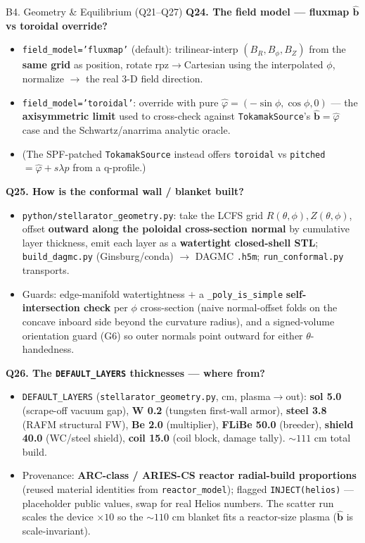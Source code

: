 \documentclass[11pt,aspectratio=169]{beamer}
\newcommand{\bhat}{\hat{\mathbf{b}}}
\newcommand{\qitem}[1]{\medskip\textbf{#1}\par}
\begin{document}
\begin{frame}[allowframebreaks]{B4. Geometry \& Equilibrium (Q21--Q27)}
\qitem{Q24. The field model --- fluxmap $\bhat$ vs toroidal override?}
\begin{itemize}
\item \texttt{field\_model='fluxmap'} (default): trilinear-interp $(B_R, B_\phi, B_Z)$ from
      the \textbf{same grid} as position, rotate rpz$\to$Cartesian using the interpolated
      $\phi$, normalize $\to$ the real 3-D field direction.
\item \texttt{field\_model='toroidal'}: override with pure
      $\hat\varphi = (-\sin\phi, \cos\phi, 0)$ --- the \textbf{axisymmetric limit} used to
      cross-check against \texttt{TokamakSource}'s $\bhat = \hat\varphi$ case and the
      Schwartz/anarrima analytic oracle.
\item (The SPF-patched \texttt{TokamakSource} instead offers \texttt{toroidal} vs
      \texttt{pitched} $= \hat\varphi + s\lambda\hat p$ from a q-profile.)
\end{itemize}

\framebreak
\qitem{Q25. How is the conformal wall / blanket built?}
\begin{itemize}
\item \texttt{python/stellarator\_geometry.py}: take the LCFS grid $R(\theta,\phi),
      Z(\theta,\phi)$, offset \textbf{outward along the poloidal cross-section normal} by
      cumulative layer thickness, emit each layer as a \textbf{watertight closed-shell STL};
      \texttt{build\_dagmc.py} (Ginsburg/conda) $\to$ DAGMC \texttt{.h5m};
      \texttt{run\_conformal.py} transports.
\item Guards: edge-manifold watertightness $+$ a \texttt{\_poly\_is\_simple}
      \textbf{self-intersection check} per $\phi$ cross-section (naive normal-offset folds on
      the concave inboard side beyond the curvature radius), and a signed-volume orientation
      guard (G6) so outer normals point outward for either $\theta$-handedness.
\end{itemize}

\qitem{Q26. The \texttt{DEFAULT\_LAYERS} thicknesses --- where from?}
\begin{itemize}
\item \texttt{DEFAULT\_LAYERS} (\texttt{stellarator\_geometry.py}, cm, plasma$\to$out):
      \textbf{sol 5.0} (scrape-off vacuum gap), \textbf{W 0.2} (tungsten first-wall armor),
      \textbf{steel 3.8} (RAFM structural FW), \textbf{Be 2.0} (multiplier), \textbf{FLiBe
      50.0} (breeder), \textbf{shield 40.0} (WC/steel shield), \textbf{coil 15.0} (coil block,
      damage tally). $\sim 111$ cm total build.
\item Provenance: \textbf{ARC-class / ARIES-CS reactor radial-build proportions} (reused
      material identities from \texttt{reactor\_model}); flagged \texttt{INJECT(helios)} ---
      placeholder public values, swap for real Helios numbers. The scatter run scales the
      device $\times 10$ so the $\sim 110$ cm blanket fits a reactor-size plasma ($\bhat$ is
      scale-invariant).
\end{itemize}


\end{frame}
\end{document}
